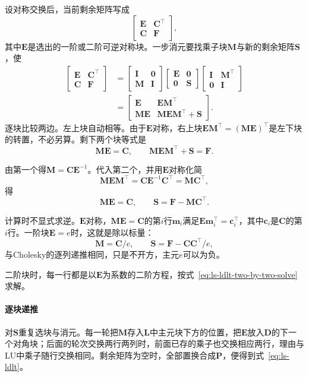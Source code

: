 设对称交换后，当前剩余矩阵写成
\[
 \begin{bmatrix}\bm E&\bm C^\top\\\bm C&\bm F\end{bmatrix},
\]
其中$\bm E$是选出的一阶或二阶可逆对称块。一步消元要找乘子块$\bm M$与新的剩余矩阵$\bm S$，使
\[
 \begin{aligned}
 \begin{bmatrix}\bm E&\bm C^\top\\\bm C&\bm F\end{bmatrix}
 &=\begin{bmatrix}\bm I&\bm0\\\bm M&\bm I\end{bmatrix}
 \begin{bmatrix}\bm E&\bm0\\\bm0&\bm S\end{bmatrix}
 \begin{bmatrix}\bm I&\bm M^\top\\\bm0&\bm I\end{bmatrix}\\
 &=\begin{bmatrix}\bm E&\bm E\bm M^\top\\\bm M\bm E&\bm M\bm E\bm M^\top+\bm S\end{bmatrix}.
 \end{aligned}
\]
逐块比较两边。左上块自动相等。由于$\bm E$对称，右上块$\bm E\bm M^\top=(\bm M\bm E)^\top$是左下块的转置，不必另算。剩下两个块等式是
\[
  \bm M\bm E=\bm C, \qquad \bm M\bm E\bm M^\top+\bm S=\bm F .
\]

由第一个得$\bm M=\bm C\bm E^{-1}$。代入第二个，并用$\bm E$对称化简
\[
 \bm M\bm E\bm M^\top=\bm C\bm E^{-1}\bm C^\top=\bm M\bm C^\top ,
\]
得
\begin{equation}
 \bm M\bm E=\bm C,\qquad
 \bm S=\bm F-\bm M\bm C^\top .
 \label{eq:ls-ldlt-block-step}
\end{equation}

计算时不显式求逆。$\bm E$对称，$\bm M\bm E=\bm C$的第$i$行$\bm m_i$满足$\bm E\bm m_i^\top=\bm c_i^\top$，其中$\bm c_i$是$\bm C$的第$i$行。一阶块$\bm E=e$时，这就是除以标量：
\[
  \bm M=\bm C/e, \qquad \bm S=\bm F-\bm C\bm C^\top/e ,
\]
与Cholesky的逐列递推相同，只是不开方，主元$e$可以为负。

二阶块时，每一行都是以$\bm E$为系数的二阶方程，按式~\eqref{eq:ls-ldlt-two-by-two-solve}求解。

\paragraph{逐块递推}
对$\bm S$重复选块与消元。每一轮把$\bm M$存入$\bm L$中主元块下方的位置，把$\bm E$放入$\bm D$的下一个对角块；后面的轮次交换两行两列时，前面已存的乘子也交换相应两行，理由与LU中乘子随行交换相同。剩余矩阵为空时，全部置换合成$\bm P$，便得到式~\eqref{eq:ls-ldlt}。

